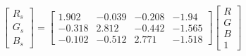 \begin{equation}
\begin{bmatrix}
  R_s \\ G_s \\ B_s 
\end{bmatrix}=
\left[\begin{matrix}1.902 & -0.039 & -0.208 & -1.94\\ 
-0.318 & 2.812 & -0.442 & -1.565\\ 
-0.102 & -0.512 & 2.771 & -1.518\end{matrix}\right]
\begin{bmatrix}
  R \\ G \\ B \\ 1 
\end{bmatrix}
\end{equation}
